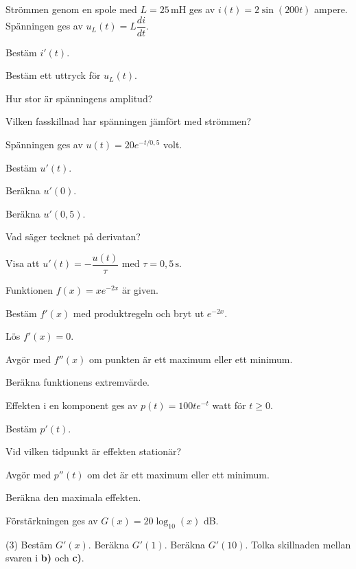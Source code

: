 Strömmen genom en spole med $L = 25\,\text{mH}$ ges av $i(t) = 2\sin(200t)$ ampere. Spänningen
ges av $u_L(t) = L\dfrac{di}{dt}$.
\begin{parts}
  \item Bestäm $i'(t)$.
  \item Bestäm ett uttryck för $u_L(t)$.
  \item Hur stor är spänningens amplitud?
  \item Vilken fasskillnad har spänningen jämfört med strömmen?
\end{parts}

Spänningen ges av $u(t) = 20e^{-t/0{,}5}$ volt.
\begin{parts}
  \item Bestäm $u'(t)$.
  \item Beräkna $u'(0)$.
  \item Beräkna $u'(0{,}5)$.
  \item Vad säger tecknet på derivatan?
  \item Visa att $u'(t) = -\dfrac{u(t)}{\tau}$ med $\tau = 0{,}5\,\text{s}$.
\end{parts}

Funktionen $f(x) = xe^{-2x}$ är given.
\begin{parts}
  \item Bestäm $f'(x)$ med produktregeln och bryt ut $e^{-2x}$.
  \item Lös $f'(x) = 0$.
  \item Avgör med $f''(x)$ om punkten är ett maximum eller ett minimum.
  \item Beräkna funktionens extremvärde.
\end{parts}

Effekten i en komponent ges av $p(t) = 100te^{-t}$ watt för $t \geq 0$.
\begin{parts}
  \item Bestäm $p'(t)$.
  \item Vid vilken tidpunkt är effekten stationär?
  \item Avgör med $p''(t)$ om det är ett maximum eller ett minimum.
  \item Beräkna den maximala effekten.
\end{parts}

Förstärkningen ges av $G(x) = 20\log_{10}(x)$ dB.
\begin{delar}(3)
  \task Bestäm $G'(x)$.
  \task Beräkna $G'(1)$.
  \task Beräkna $G'(10)$.
  \task* Tolka skillnaden mellan svaren i \textbf{b)} och \textbf{c)}.
\end{delar}

